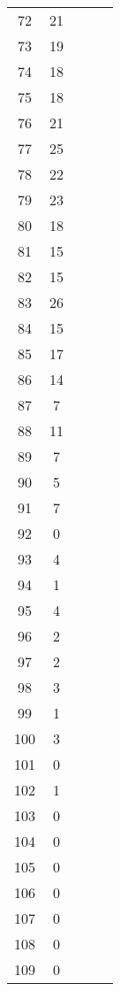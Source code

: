 \begin{center}
\begin{table}[H]
\begin{tabular}{ccccc}
\num{   72} & \num{   21} \\
\num{   73} & \num{   19} \\
\num{   74} & \num{   18} \\
\num{   75} & \num{   18} \\
\num{   76} & \num{   21} \\
\num{   77} & \num{   25} \\
\num{   78} & \num{   22} \\
\num{   79} & \num{   23} \\
\num{   80} & \num{   18} \\
\num{   81} & \num{   15} \\
\num{   82} & \num{   15} \\
\num{   83} & \num{   26} \\
\num{   84} & \num{   15} \\
\num{   85} & \num{   17} \\
\num{   86} & \num{   14} \\
\num{   87} & \num{    7} \\
\num{   88} & \num{   11} \\
\num{   89} & \num{    7} \\
\num{   90} & \num{    5} \\
\num{   91} & \num{    7} \\
\num{   92} & \num{    0} \\
\num{   93} & \num{    4} \\
\num{   94} & \num{    1} \\
\num{   95} & \num{    4} \\
\num{   96} & \num{    2} \\
\num{   97} & \num{    2} \\
\num{   98} & \num{    3} \\
\num{   99} & \num{    1} \\
\num{  100} & \num{    3} \\
\num{  101} & \num{    0} \\
\num{  102} & \num{    1} \\
\num{  103} & \num{    0} \\
\num{  104} & \num{    0} \\
\num{  105} & \num{    0} \\
\num{  106} & \num{    0} \\
\num{  107} & \num{    0} \\
\num{  108} & \num{    0} \\
\num{  109} & \num{    0} \\

\end{tabular}
\end{table}
\end{center}
